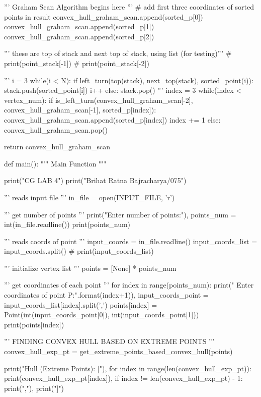 \documentclass[a4paper,12pt]{article}
\begin{document}
\begin{spacing}{1}
\begin{footnotesize}
\begin{spverbatim}
    ''' Graham Scan Algorithm begins here '''
    # add first three coordinates of sorted points in result
    convex_hull_graham_scan.append(sorted_p[0])
    convex_hull_graham_scan.append(sorted_p[1])
    convex_hull_graham_scan.append(sorted_p[2])

    ''' these are top of stack and next top of stack, using list (for testing)'''
    # print(point_stack[-1])
    # print(point_stack[-2])

    '''
        i = 3
        while(i < N):
            if left_turn(top(stack), next_top(stack), sorted_point(i)):
                stack.push(sorted_point[i])
                i++
            else:
                stack.pop()
    '''
    index = 3
    while(index < vertex_num):
        if is_left_turn(convex_hull_graham_scan[-2], convex_hull_graham_scan[-1], sorted_p[index]):
            convex_hull_graham_scan.append(sorted_p[index])
            index += 1
        else:
            convex_hull_graham_scan.pop()

    return convex_hull_graham_scan

def main():
    """ Main Function """

    print("CG LAB 4")
    print("Brihat Ratna Bajracharya/075\n")

    ''' reads input file '''
    in_file = open(INPUT_FILE, 'r')

    ''' get number of points '''
    print("Enter number of points:"),
    points_num = int(in_file.readline())
    print(points_num)

    ''' reads coords of point '''
    input_coords = in_file.readline()
    input_coords_list = input_coords.split()
    # print(input_coords_list)

    ''' initialize vertex list '''
    points = [None] * points_num

    ''' get coordinates of each point '''
    for index in range(points_num):
        print(" Enter coordinates of point P{}:".format(index+1)),
        input_coords_point = input_coords_list[index].split(',')
        points[index] = Point(int(input_coords_point[0]), int(input_coords_point[1]))
        print(points[index])

    ''' FINDING CONVEX HULL BASED ON EXTREME POINTS '''
    convex_hull_exp_pt = get_extreme_points_based_convex_hull(points)

    print("\nConvex Hull (Extreme Points): ["),
    for index in range(len(convex_hull_exp_pt)):
        print(convex_hull_exp_pt[index]),
        if index != len(convex_hull_exp_pt) - 1:
            print(","),
    print("]")


\end{spverbatim}
\end{footnotesize}
\end{spacing}
\end{document}
